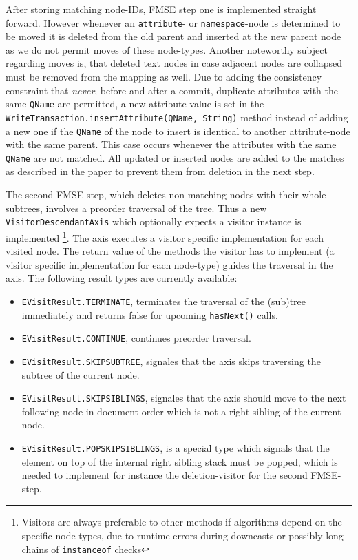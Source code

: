 After storing matching node-IDs, FMSE step one is implemented straight forward. However whenever an \texttt{attribute}- or \texttt{namespace}-node is determined to be moved it is deleted from the old parent and inserted at the new parent node as we do not permit moves of these node-types. Another noteworthy subject regarding moves is, that deleted text nodes in case adjacent nodes are collapsed must be removed from the mapping as well. Due to adding the consistency constraint that \emph{never}, before and after a commit, duplicate attributes with the same \texttt{QName} are permitted, a new attribute value is set in the \texttt{WriteTransaction.insertAttribute(QName, String)} method instead of adding a new one if the \texttt{QName} of the node to insert is identical to another attribute-node with the same parent. This case occurs whenever the attributes with the same \texttt{QName} are not matched. All updated or inserted nodes are added to the matches as described in the paper to prevent them from deletion in the next step.

The second FMSE step, which deletes non matching nodes with their whole subtrees, involves a preorder traversal of the tree. Thus a new \\\texttt{VisitorDescendantAxis} which optionally expects a visitor instance is implemented \footnote{Visitors are always preferable to other methods if algorithms depend on the specific node-types, due to runtime errors during downcasts or possibly long chains of \texttt{instanceof} checks}. The axis executes a visitor specific implementation for each visited node. The return value of the methods the visitor has to implement (a visitor specific implementation for each node-type) guides the traversal in the axis. The following result types are currently available:

\begin{itemize}
\item \texttt{EVisitResult.TERMINATE}, terminates the traversal of the (sub)tree immediately and returns false for upcoming \texttt{hasNext()} calls.
\item \texttt{EVisitResult.CONTINUE}, continues preorder traversal.
\item \texttt{EVisitResult.SKIPSUBTREE}, signales that the axis skips traversing the subtree of the current node.
\item \texttt{EVisitResult.SKIPSIBLINGS}, signales that the axis should move to the next following node in document order which is not a right-sibling of the current node.
\item \texttt{EVisitResult.POPSKIPSIBLINGS}, is a special type which signals that the element on top of the internal right sibling stack must be popped, which is needed to implement for instance the deletion-visitor for the second FMSE-step.
\end{itemize}

